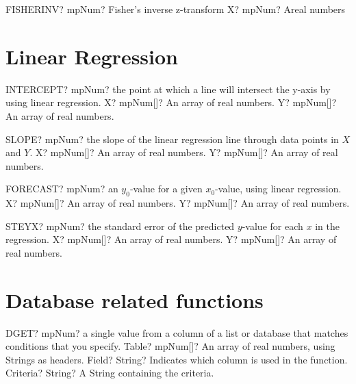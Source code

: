 \documentclass[12pt,a4paper,openany]{book}
\begin{document}
\begin{mpFunctionsExtract}
\mpWorksheetFunctionOneNotImplemented
{FISHERINV? mpNum? Fisher's inverse z-transform}
{X? mpNum? Areal numbers}
\end{mpFunctionsExtract}

\section{Linear Regression}

\begin{mpFunctionsExtract}
\mpWorksheetFunctionTwoNotImplemented
{INTERCEPT? mpNum? the point at which a line will intersect the y-axis by using linear regression.}
{X? mpNum[]? An array of real numbers.}
{Y? mpNum[]? An array of real numbers.}
\end{mpFunctionsExtract}

\begin{mpFunctionsExtract}
\mpWorksheetFunctionTwoNotImplemented
{SLOPE? mpNum? the slope of the linear regression line through data points in $X$ and $Y$.}
{X? mpNum[]? An array of real numbers.}
{Y? mpNum[]? An array of real numbers.}
\end{mpFunctionsExtract}

\begin{mpFunctionsExtract}
\mpWorksheetFunctionTwoNotImplemented
{FORECAST? mpNum? an $y_0$-value for a given $x_0$-value, using linear regression.}
{X? mpNum[]? An array of real numbers.}
{Y? mpNum[]? An array of real numbers.}
\end{mpFunctionsExtract}

\begin{mpFunctionsExtract}
\mpWorksheetFunctionTwoNotImplemented
{STEYX? mpNum? the standard error of the predicted $y$-value for each $x$ in the regression.}
{X? mpNum[]? An array of real numbers.}
{Y? mpNum[]? An array of real numbers.}
\end{mpFunctionsExtract}

\section{Database related functions}

\begin{mpFunctionsExtract}
\mpWorksheetFunctionThreeNotImplemented
{DGET? mpNum? a single value from a column of a list or database that matches conditions that you specify.}
{Table? mpNum[]? An array of real numbers, using Strings as headers.}
{Field? String? Indicates which column is used in the function.}
{Criteria? String? A String containing the criteria.}
\end{mpFunctionsExtract}
\end{document}
